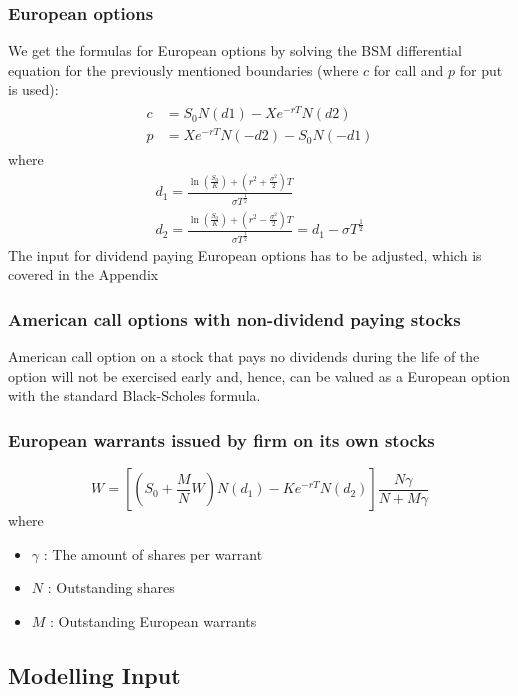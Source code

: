 \documentclass{article}
\begin{document}
\subsubsection{European options}
We get the formulas for European options by solving the BSM differential equation for the previously mentioned boundaries (where $c$ for call and $p$ for put is used):
\begin{align}
    \begin{split} \label{eq:38}
        c &= S_{0}N(d1) - X e^{-rT} N(d2) \\ 
        p &= X e^{-rT} N(-d2) - S_{0} N(-d1)
    \end{split}
\end{align}
where 
\begin{gather*}
        d_{1} = \frac{\ln\left(\frac{S_{0}}{K}\right)+\left(r^{2}+\frac{\sigma^{2}}{2}\right)T}{\sigma T^{\frac{1}{2}}} \\
        d_{2} = \frac{\ln\left(\frac{S_{0}}{K}\right)+\left(r^{2}-\frac{\sigma^{2}}{2}\right)T}{\sigma T^{\frac{1}{2}}} = d_{1} - \sigma T^{\frac{1}{2}}
\end{gather*}
The input for dividend paying European options has to be adjusted, which is covered in the Appendix
\subsubsection{American call options with non-dividend paying stocks}
American call option on a stock that pays no dividends during the life of the option will not be exercised early and, hence, can be valued as a European option with the standard Black-Scholes formula.
\subsubsection{European warrants issued by firm on its own stocks}
\begin{equation}
    W = \left[\left(S_{0} + \frac{M}{N}W\right)N(d_{1}) - Ke^{-rT}N(d_{2})\right]\frac{N\gamma}{N + M\gamma}
\end{equation}
where 
\begin{itemize}
    \item $\gamma$ : The amount of shares per warrant
    \item $N$ : Outstanding shares
    \item $M$ : Outstanding European warrants
\end{itemize}
\subsection{Modelling Input}
\end{document}
